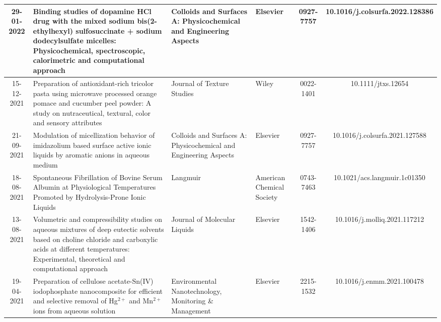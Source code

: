 \documentclass{article}
\begin{document}
\begin{landscape}
\begin{longtable}{|c|p{6cm}|p{3cm}|p{3cm}|c|c|}
		29-01-2022 & Binding studies of dopamine HCl drug with the mixed sodium bis(2-ethylhexyl) sulfosuccinate + sodium dodecylsulfate micelles: Physicochemical, spectroscopic, calorimetric and computational approach & Colloids and Surfaces A: Physicochemical and Engineering Aspects & Elsevier & 0927-7757 & 10.1016/j.colsurfa.2022.128386 \\
		\hline
		
		15-12-2021 & Preparation of antioxidant-rich tricolor pasta using microwave processed orange pomace and cucumber peel powder: A study on nutraceutical, textural, color and sensory attributes & Journal of Texture Studies & Wiley & 0022-1401 & 10.1111/jtxs.12654 \\
		\hline
		
		21-09-2021 & Modulation of micellization behavior of imidazolium based surface active ionic liquids by aromatic anions in aqueous medium & Colloids and Surfaces A: Physicochemical and Engineering Aspects & Elsevier & 0927-7757 & 10.1016/j.colsurfa.2021.127588 \\
		\hline
		
		18-08-2021 & Spontaneous Fibrillation of Bovine Serum Albumin at Physiological Temperatures Promoted by Hydrolysis-Prone Ionic Liquids & Langmuir & American Chemical Society & 0743-7463 & 10.1021/acs.langmuir.1c01350 \\
		\hline
		
		13-08-2021 & Volumetric and compressibility studies on aqueous mixtures of deep eutectic solvents based on choline chloride and carboxylic acids at different temperatures: Experimental, theoretical and computational approach & Journal of Molecular Liquids & Elsevier & 1542-1406 & 10.1016/j.molliq.2021.117212 \\
		\hline
		
		19-04-2021 & Preparation of cellulose acetate-Sn(IV) iodophosphate nanocomposite for efficient and selective removal of Hg$^{2+}$ and Mn$^{2+}$ ions from aqueous solution & Environmental Nanotechnology, Monitoring \& Management & Elsevier & 2215-1532 & 10.1016/j.enmm.2021.100478 \\
		\hline
		
	\end{longtable}
\end{landscape}
	
\end{document}
